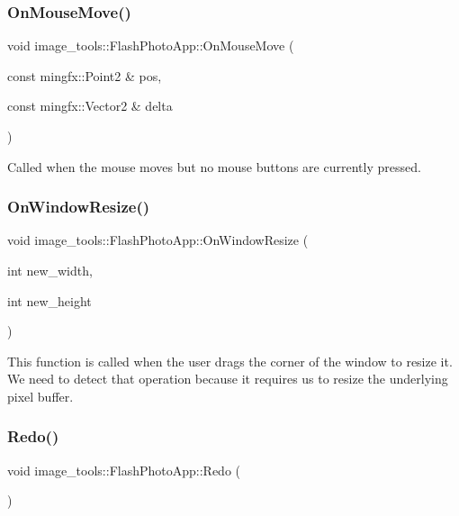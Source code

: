 \subsubsection{\texorpdfstring{On\+Mouse\+Move()}{OnMouseMove()}}
{\footnotesize\ttfamily void image\+\_\+tools\+::\+Flash\+Photo\+App\+::\+On\+Mouse\+Move (\begin{DoxyParamCaption}\item[{const mingfx\+::\+Point2 \&}]{pos,  }\item[{const mingfx\+::\+Vector2 \&}]{delta }\end{DoxyParamCaption})\hspace{0.3cm}{\ttfamily [override]}}

Called when the mouse moves but no mouse buttons are currently pressed. \mbox{\label{classimage__tools_1_1FlashPhotoApp_afab3ded368aee035c7c229226048479a}} 
\subsubsection{\texorpdfstring{On\+Window\+Resize()}{OnWindowResize()}}
{\footnotesize\ttfamily void image\+\_\+tools\+::\+Flash\+Photo\+App\+::\+On\+Window\+Resize (\begin{DoxyParamCaption}\item[{int}]{new\+\_\+width,  }\item[{int}]{new\+\_\+height }\end{DoxyParamCaption})\hspace{0.3cm}{\ttfamily [override]}}

This function is called when the user drags the corner of the window to resize it. We need to detect that operation because it requires us to resize the underlying pixel buffer. \mbox{\label{classimage__tools_1_1FlashPhotoApp_ae5c00d6fcdd2ec8a7979104793273c0a}} 
\subsubsection{\texorpdfstring{Redo()}{Redo()}}
{\footnotesize\ttfamily void image\+\_\+tools\+::\+Flash\+Photo\+App\+::\+Redo (\begin{DoxyParamCaption}{ }\end{DoxyParamCaption})}

